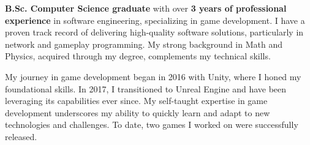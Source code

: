 

\begin{cvparagraph}

\textbf{B.Sc. Computer Science graduate} with over \textbf{3 years of professional experience} in software engineering, specializing in game development. I have a proven track record of delivering high-quality software solutions, particularly in network and gameplay programming. My strong background in Math and Physics, acquired through my degree, complements my technical skills.

My journey in game development began in 2016 with Unity, where I honed my foundational skills. In 2017, I transitioned to Unreal Engine and have been leveraging its capabilities ever since. My self-taught expertise in game development underscores my ability to quickly learn and adapt to new technologies and challenges. To date, two games I worked on were successfully released.

\end{cvparagraph}